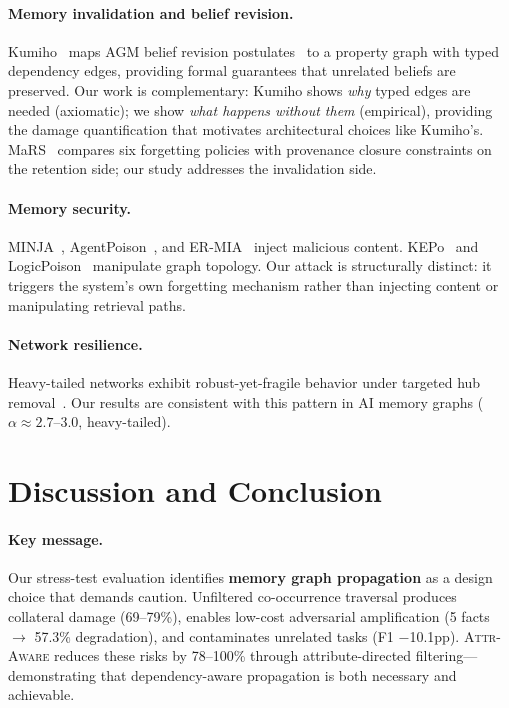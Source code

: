 \documentclass{article}
\newcommand{\attraware}{\textsc{Attr-Aware}}
\begin{document}
\paragraph{Memory invalidation and belief revision.}
Kumiho~\citep{kumiho_2026} maps AGM belief revision postulates~\citep{agm_1985} to a property graph with typed dependency edges, providing formal guarantees that unrelated beliefs are preserved.
Our work is complementary: Kumiho shows \textit{why} typed edges are needed (axiomatic); we show \textit{what happens without them} (empirical), providing the damage quantification that motivates architectural choices like Kumiho's.
MaRS~\citep{mars_2025} compares six forgetting policies with provenance closure constraints on the retention side; our study addresses the invalidation side.

\paragraph{Memory security.}
MINJA~\citep{minja_2025}, AgentPoison~\citep{agentpoison_2024}, and ER-MIA~\citep{ermia_2026} inject malicious content.
KEPo~\citep{kepo_2026} and LogicPoison~\citep{logicpoison_2026} manipulate graph topology.
Our attack is structurally distinct: it triggers the system's own forgetting mechanism rather than injecting content or manipulating retrieval paths.

\paragraph{Network resilience.}
Heavy-tailed networks exhibit robust-yet-fragile behavior under targeted hub removal~\citep{albert_attack_2000, cohen_percolation_2000}.
Our results are consistent with this pattern in AI memory graphs ($\alpha \approx 2.7$--$3.0$, heavy-tailed).


\section{Discussion and Conclusion}
\label{sec:conclusion}

\paragraph{Key message.}
Our stress-test evaluation identifies \textbf{memory graph propagation} as a design choice that demands caution.
Unfiltered co-occurrence traversal produces collateral damage (69--79\%), enables low-cost adversarial amplification (5 facts $\rightarrow$ 57.3\% degradation), and contaminates unrelated tasks (F1 $-$10.1pp).
\attraware{} reduces these risks by 78--100\% through attribute-directed filtering---demonstrating that dependency-aware propagation is both necessary and achievable.
\end{document}
